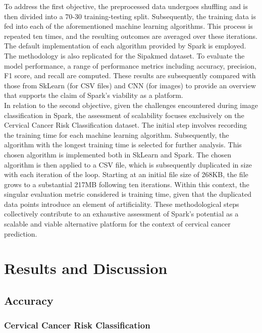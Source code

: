 \documentclass[12pt]{report}
\begin{document}
To address the first objective, the preprocessed data undergoes shuffling and is then divided into a 70-30 training-testing split. Subsequently, the training data is fed into each of the aforementioned machine learning algorithms. This process is repeated ten times, and the resulting outcomes are averaged over these iterations. The default implementation of each algorithm provided by Spark is employed. The methodology is also replicated for the Sipakmed dataset. To evaluate the model performance, a range of performance metrics including accuracy, precision, F1 score, and recall are computed. These results are subsequently compared with those from SkLearn (for CSV files) and CNN (for images) to provide an overview that supports the claim of Spark's viability as a platform.\\
\indent In relation to the second objective, given the challenges encountered during image classification in Spark, the assessment of scalability focuses exclusively on the Cervical Cancer Risk Classification dataset. The initial step involves recording the training time for each machine learning algorithm. Subsequently, the algorithm with the longest training time is selected for further analysis. This chosen algorithm is implemented both in SkLearn and Spark. The chosen algorithm is then applied to a CSV file, which is subsequently duplicated in size with each iteration of the loop. Starting at an initial file size of 268KB, the file grows to a substantial 217MB following ten iterations. Within this context, the singular evaluation metric considered is training time, given that the duplicated data points introduce an element of artificiality. These methodological steps collectively contribute to an exhaustive assessment of Spark's potential as a scalable and viable alternative platform for the context of cervical cancer prediction.\\

\section{Results and Discussion}
\subsection{Accuracy}
\subsubsection{Cervical Cancer Risk Classification}


\end{document}
